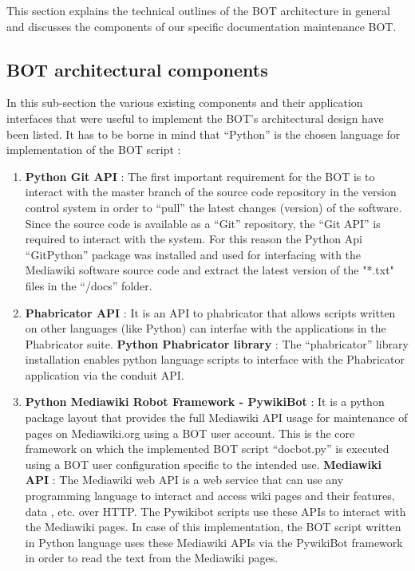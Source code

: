 This section explains the technical outlines of the BOT architecture in general and discusses the components of our specific documentation maintenance BOT.

\subsection{BOT architectural components}
In this sub-section the various existing components and their application interfaces that were useful to implement the BOT's architectural design have been listed. It has to be borne in mind that \enquote{Python} is the chosen language for implementation of the BOT script :
\begin{enumerate}
\item \textbf{Python Git API} \cite{git_py} : The first important requirement for the BOT is to interact with the master branch of the source code repository in the version control system in order to \enquote{pull} the latest changes (version) of the software. Since the source code is available as a \enquote{Git} repository, the \enquote{Git API} is required to interact with the system. For this reason the Python Api \enquote{GitPython} package was installed and used for interfacing with the Mediawiki software source code and extract the latest version of the "*.txt" files in the \enquote{/docs} folder.
\item \textbf{Phabricator API} \cite{phab_api} : It is an API to phabricator that allows scripts written on other languages (like Python) can interfae with the applications in the Phabricator suite.
\newline \textbf{Python Phabricator library} \cite{phab_py} : The \enquote{phabricator} library installation enables python language scripts to interface with the Phabricator application via the conduit API. 
\item \textbf{Python Mediawiki Robot Framework - PywikiBot} \cite{manual_pwb} : It is a python package layout that provides the full Mediawiki API usage for maintenance of pages on Mediawiki.org using a BOT user account. This is the core framework on which the implemented BOT script \enquote{docbot.py} is executed using a BOT user configuration specific to the intended use.
\newline \textbf{Mediawiki API} \cite{mw_api} : The Mediawiki web API is a web service that can use any programming language to interact and access wiki pages and their features, data , etc. over HTTP. The Pywikibot scripts use these APIs to interact with the Mediawiki pages. In case of this implementation, the BOT script written in Python language uses these Mediawiki APIs via the PywikiBot framework in order to read the text from the Mediawiki pages. 
\end{enumerate}

